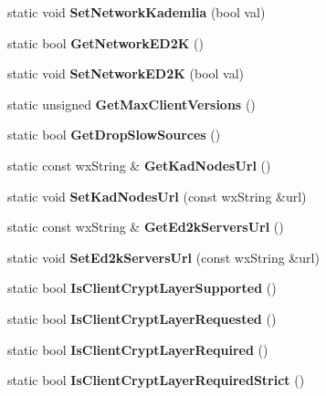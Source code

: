 \begin{DoxyCompactItemize}
\item 
static void {\bfseries SetNetworkKademlia} (bool val)\label{classCPreferences_ad3bb86e8652e32cfc41cbcb282d85c8f}

\item 
static bool {\bfseries GetNetworkED2K} ()\label{classCPreferences_a8285d38792d03c78d21989da5370f84f}

\item 
static void {\bfseries SetNetworkED2K} (bool val)\label{classCPreferences_ad0383ac7c4f075f5341e74b279bd9b0e}

\item 
static unsigned {\bfseries GetMaxClientVersions} ()\label{classCPreferences_a2a5a275cd6b25adf6ec80bca9fb4149b}

\item 
static bool {\bfseries GetDropSlowSources} ()\label{classCPreferences_aa0b0409cb4230483b83278aa5dbceab5}

\item 
static const wxString \& {\bfseries GetKadNodesUrl} ()\label{classCPreferences_ac85252604b4a5adefcdfd289d92d53da}

\item 
static void {\bfseries SetKadNodesUrl} (const wxString \&url)\label{classCPreferences_abfcad5ca37324bd145fa059fc1aaf5b0}

\item 
static const wxString \& {\bfseries GetEd2kServersUrl} ()\label{classCPreferences_aa20ca2c17f679d26c9029778a89223d6}

\item 
static void {\bfseries SetEd2kServersUrl} (const wxString \&url)\label{classCPreferences_a4ccfbf3b866124c1f4dda12268df2778}

\item 
static bool {\bfseries IsClientCryptLayerSupported} ()\label{classCPreferences_ab8bc3dd1c23aa482277ba7bccfecdd5d}

\item 
static bool {\bfseries IsClientCryptLayerRequested} ()\label{classCPreferences_a903b568ca5f1bf0410d271327dd7db1b}

\item 
static bool {\bfseries IsClientCryptLayerRequired} ()\label{classCPreferences_ad9f2ef43ecac2a2c49469173b510fb21}

\item 
static bool {\bfseries IsClientCryptLayerRequiredStrict} ()\label{classCPreferences_a3c70766ef1d48b5151f6c78b8a549412}


\end{DoxyCompactItemize}
